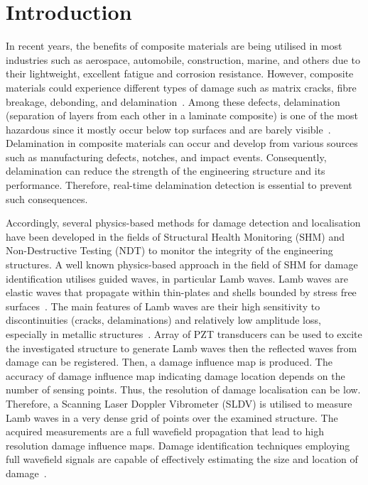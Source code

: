\section{Introduction}
In recent years, the benefits of composite materials are being utilised in most industries such as aerospace, automobile, construction, marine, and others due to their lightweight, excellent fatigue and corrosion resistance.
However, composite materials could experience different types of damage such as matrix cracks, fibre breakage, debonding, and delamination~\cite{ip2004delamination, smith2009composite}. 
Among these defects, delamination (separation of layers from each other in a laminate composite) is one of the most hazardous since it mostly occur below top surfaces and are barely visible~\cite{Cai2012}.
Delamination in composite materials can occur and develop from various sources such as  manufacturing defects, notches, and impact events.
Consequently, delamination can reduce the strength of the engineering structure and its performance. 
Therefore, real-time delamination detection is essential to prevent such consequences. 
 
Accordingly, several physics-based methods for damage detection and localisation have been developed in the fields of Structural Health Monitoring (SHM) and Non-Destructive Testing (NDT) to monitor the integrity of the engineering structures.
A well known physics-based approach in the field of SHM for damage identification utilises guided waves, in particular Lamb waves.
Lamb waves are elastic waves that propagate within thin-plates and shells bounded by stress free surfaces~\cite{mitra2016guided}.
The main features of Lamb waves are their high sensitivity to discontinuities (cracks, delaminations) and relatively low amplitude loss, especially in metallic structures~\cite{Keulen2014}.
Array of PZT transducers can be used to excite the investigated structure to generate Lamb waves then the reflected waves from damage can be registered. 
Then, a damage influence map is produced.
The accuracy of damage influence map indicating damage location depends on the number of sensing points. 
Thus, the resolution of damage localisation can be low.
Therefore, a Scanning Laser Doppler Vibrometer (SLDV) is utilised to measure Lamb waves in a very dense grid of points over the examined structure.
The acquired measurements are a full wavefield propagation that lead to high resolution damage influence maps.
Damage identification techniques employing full wavefield signals are capable of effectively estimating the size and location of damage~\cite{Girolamo2018a, kudela2018impact}. 

